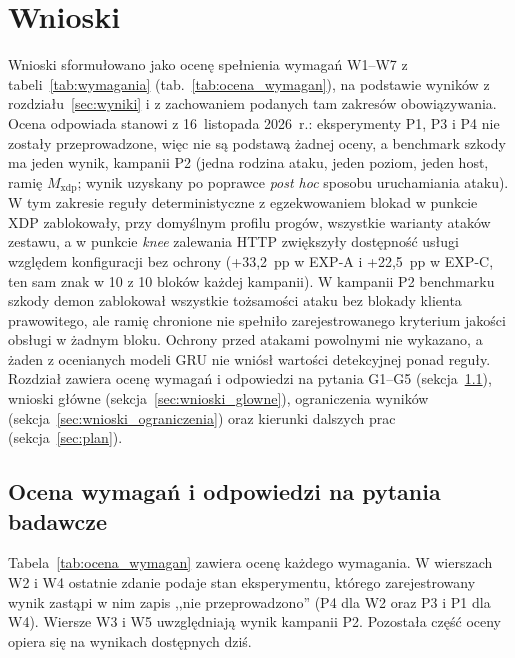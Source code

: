 \documentclass[a4paper,12pt]{article}
\begin{document}
\section{Wnioski}\label{sec:wnioski}
Wnioski sformułowano jako ocenę spełnienia wymagań W1--W7 z tabeli~\ref{tab:wymagania} (tab.~\ref{tab:ocena_wymagan}), na podstawie wyników z rozdziału~\ref{sec:wyniki} i z zachowaniem podanych tam zakresów obowiązywania. Ocena odpowiada stanowi z 16~listopada 2026~r.: eksperymenty P1, P3 i P4 nie zostały przeprowadzone, więc nie są podstawą żadnej oceny, a benchmark szkody ma jeden wynik, kampanii P2 (jedna rodzina ataku, jeden poziom, jeden host, ramię $M_{\mathrm{xdp}}$; wynik uzyskany po poprawce \textit{post hoc} sposobu uruchamiania ataku). W tym zakresie reguły deterministyczne z egzekwowaniem blokad w punkcie XDP zablokowały, przy domyślnym profilu progów, wszystkie warianty ataków zestawu, a w punkcie \textit{knee} zalewania HTTP zwiększyły dostępność usługi względem konfiguracji bez ochrony (+33,2~pp w EXP-A i +22,5~pp w EXP-C, ten sam znak w 10 z 10 bloków każdej kampanii). W kampanii P2 benchmarku szkody demon zablokował wszystkie tożsamości ataku bez blokady klienta prawowitego, ale ramię chronione nie spełniło zarejestrowanego kryterium jakości obsługi w żadnym bloku. Ochrony przed atakami powolnymi nie wykazano, a żaden z ocenianych modeli GRU nie wniósł wartości detekcyjnej ponad reguły. Rozdział zawiera ocenę wymagań i odpowiedzi na pytania G1--G5 (sekcja~\ref{sec:ocena_wymagan}), wnioski główne (sekcja~\ref{sec:wnioski_glowne}), ograniczenia wyników (sekcja~\ref{sec:wnioski_ograniczenia}) oraz kierunki dalszych prac (sekcja~\ref{sec:plan}).

\subsection{Ocena wymagań i odpowiedzi na pytania badawcze}\label{sec:ocena_wymagan}
Tabela~\ref{tab:ocena_wymagan} zawiera ocenę każdego wymagania. W wierszach W2 i W4 ostatnie zdanie podaje stan eksperymentu, którego zarejestrowany wynik zastąpi w nim zapis ,,nie przeprowadzono'' (P4 dla W2 oraz P3 i P1 dla W4). Wiersze W3 i W5 uwzględniają wynik kampanii P2. Pozostała część oceny opiera się na wynikach dostępnych dziś.
\end{document}
